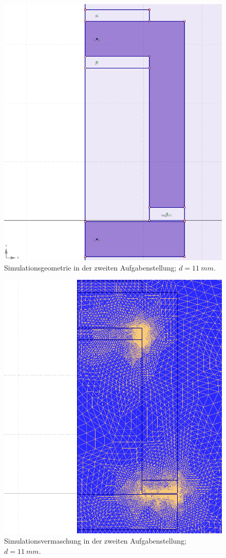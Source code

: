 \documentclass[conference,a4paper,twoside]{IEEEtran}
\begin{document}
\begin{figure}
\centerline{\includegraphics[width=0.7\columnwidth]{../assets/assignment_2_geometry.png}}
\caption{Simulationsgeometrie in der zweiten Aufgabenstellung; $d = 11\ mm$.}
\label{assignment_2_geometry}
\end{figure}

\begin{figure}
\centerline{\includegraphics[width=0.7\columnwidth]{../assets/assignment_2_mesh.png}}
\caption{Simulationsvermaschung in der zweiten Aufgabenstellung; $d = 11\ mm$.}
\label{assignment_2_mesh}
\end{figure}
\end{document}
